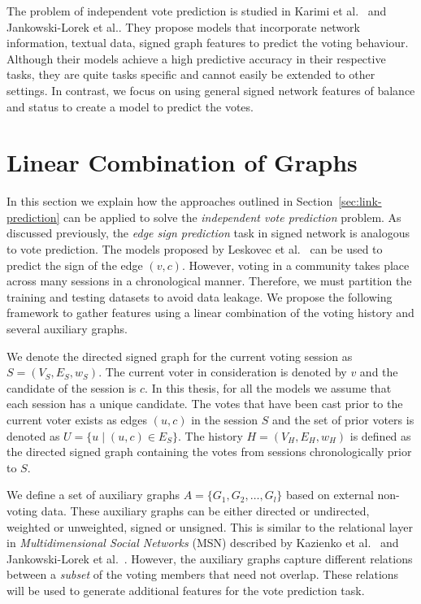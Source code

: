 The problem of independent vote prediction is studied in Karimi et al.\ \cite{karimi2019multicongress} and Jankowski-Lorek et al.\cite{jankowski-lorek2013MBSN}.
They propose models that incorporate network information, textual data, signed graph features to predict the voting behaviour.
Although their models achieve a high predictive accuracy in their respective tasks, they are quite tasks specific and cannot easily be extended to other settings.
In contrast, we focus on using general signed network features of balance and status to create a model to predict the votes. 

\fi

\section{Linear Combination of Graphs}
\label{sec:linear-combination-theory}

In this section we explain how the approaches outlined in Section~\ref{sec:link-prediction} can be applied to solve the \textit{independent vote prediction} problem.
As discussed previously, the \textit{edge sign prediction} task in signed network is analogous to vote prediction.
The models proposed by Leskovec et al.\ \cite{leskovec2010predicting} can be used to predict the sign of the edge $(v,c)$.
However, voting in a community takes place across many sessions in a chronological manner.
Therefore, we must partition the training and testing datasets to avoid data leakage.
We propose the following framework to gather features using a linear combination of the voting history and several auxiliary graphs.

We denote the directed signed graph for the current voting session as $S=(V_S,E_S,w_S)$.
The current voter in consideration is denoted by $v$ and the candidate of the session is $c$.
In this thesis, for all the models we assume that each session has a unique candidate.
The votes that have been cast prior to the current voter exists as edges $(u,c)$ in the session $S$ and the set of prior voters is denoted as $U =\{u \mid (u,c) \in E_S\}$.
The history $H=(V_H,E_H,w_H)$ is defined as the directed signed graph containing the votes from sessions chronologically prior to $S$.

We define a set of auxiliary graphs $A = \{G_1,G_2,\dots,G_l\}$ based on external non-voting data.
These auxiliary graphs can be either directed or undirected, weighted or unweighted, signed or unsigned.
This is similar to the relational layer in \textit{Multidimensional Social Networks} (MSN) described by Kazienko et al.\ \cite{kazienko2011multidimensional} and Jankowski-Lorek et al.\ \cite{jankowski-lorek2013MBSN}.
However, the auxiliary graphs capture different relations between a \textit{subset} of the voting members that need not overlap.
These relations will be used to generate additional features for the vote prediction task. 

